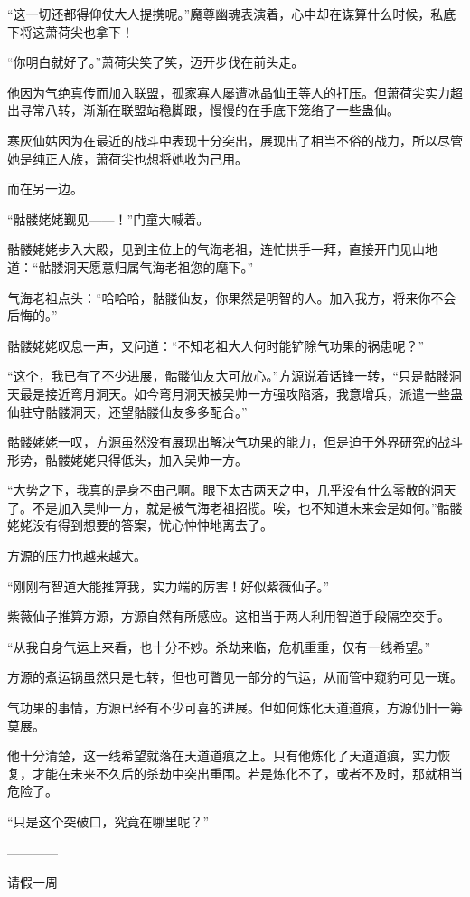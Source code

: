 \begin{this_body}
“这一切还都得仰仗大人提携呢。”魔尊幽魂表演着，心中却在谋算什么时候，私底下将这萧荷尖也拿下！

“你明白就好了。”萧荷尖笑了笑，迈开步伐在前头走。

他因为气绝真传而加入联盟，孤家寡人屡遭冰晶仙王等人的打压。但萧荷尖实力超出寻常八转，渐渐在联盟站稳脚跟，慢慢的在手底下笼络了一些蛊仙。

寒灰仙姑因为在最近的战斗中表现十分突出，展现出了相当不俗的战力，所以尽管她是纯正人族，萧荷尖也想将她收为己用。

而在另一边。

“骷髅姥姥觐见——！”门童大喊着。

骷髅姥姥步入大殿，见到主位上的气海老祖，连忙拱手一拜，直接开门见山地道：“骷髅洞天愿意归属气海老祖您的麾下。”

气海老祖点头：“哈哈哈，骷髅仙友，你果然是明智的人。加入我方，将来你不会后悔的。”

骷髅姥姥叹息一声，又问道：“不知老祖大人何时能铲除气功果的祸患呢？”

“这个，我已有了不少进展，骷髅仙友大可放心。”方源说着话锋一转，“只是骷髅洞天最是接近弯月洞天。如今弯月洞天被吴帅一方强攻陷落，我意增兵，派遣一些蛊仙驻守骷髅洞天，还望骷髅仙友多多配合。”

骷髅姥姥一叹，方源虽然没有展现出解决气功果的能力，但是迫于外界研究的战斗形势，骷髅姥姥只得低头，加入吴帅一方。

“大势之下，我真的是身不由己啊。眼下太古两天之中，几乎没有什么零散的洞天了。不是加入吴帅一方，就是被气海老祖招揽。唉，也不知道未来会是如何。”骷髅姥姥没有得到想要的答案，忧心忡忡地离去了。

方源的压力也越来越大。

“刚刚有智道大能推算我，实力端的厉害！好似紫薇仙子。”

紫薇仙子推算方源，方源自然有所感应。这相当于两人利用智道手段隔空交手。

“从我自身气运上来看，也十分不妙。杀劫来临，危机重重，仅有一线希望。”

方源的煮运锅虽然只是七转，但也可瞥见一部分的气运，从而管中窥豹可见一斑。

气功果的事情，方源已经有不少可喜的进展。但如何炼化天道道痕，方源仍旧一筹莫展。

他十分清楚，这一线希望就落在天道道痕之上。只有他炼化了天道道痕，实力恢复，才能在未来不久后的杀劫中突出重围。若是炼化不了，或者不及时，那就相当危险了。

“只是这个突破口，究竟在哪里呢？”

------------

请假一周


\end{this_body}
